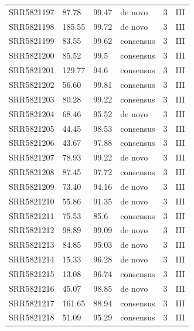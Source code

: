 \begin{longtable}{@{}llllll@{}}
SRR5821197 & 87.78         & 99.47       & de novo      & 3        & III      \\
SRR5821198 & 185.55        & 99.72       & de novo      & 3        & III      \\
SRR5821199 & 83.55         & 99.62       & consensus    & 3        & III      \\
SRR5821200 & 85.52         & 99.5        & consensus    & 3        & III      \\
SRR5821201 & 129.77        & 94.6        & consensus    & 3        & III      \\
SRR5821202 & 56.60         & 99.81       & consensus    & 3        & III      \\
SRR5821203 & 80.28         & 99.22       & consensus    & 3        & III      \\
SRR5821204 & 68.46         & 95.52       & de novo      & 3        & III      \\
SRR5821205 & 44.45         & 98.53       & consensus    & 3        & III      \\
SRR5821206 & 43.67         & 97.88       & consensus    & 3        & III      \\
SRR5821207 & 78.93         & 99.22       & de novo      & 3        & III      \\
SRR5821208 & 87.45         & 97.72       & consensus    & 3        & III      \\
SRR5821209 & 73.40         & 94.16       & de novo      & 3        & III      \\
SRR5821210 & 55.86         & 91.35       & de novo      & 3        & III      \\
SRR5821211 & 75.53         & 85.6        & consensus    & 3        & III      \\
SRR5821212 & 98.89         & 99.09       & de novo      & 3        & III      \\
SRR5821213 & 84.85         & 95.03       & de novo      & 3        & III      \\
SRR5821214 & 15.33         & 96.28       & de novo      & 3        & III      \\
SRR5821215 & 13.08         & 96.74       & consensus    & 3        & III      \\
SRR5821216 & 45.07         & 98.85       & de novo      & 3        & III      \\
SRR5821217 & 161.65        & 88.94       & consensus    & 3        & III      \\
SRR5821218 & 51.09         & 95.29       & consensus    & 3        & III      \\

\end{longtable}
